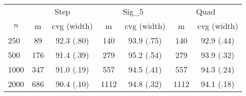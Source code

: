\begin{tabular}{lcccccc}
   \toprule
 
           & \multicolumn{2}{c}{Step}& \multicolumn{2}{c}{Sig\_5}& \multicolumn{2}{c}{Quad} \\ 
             \cmidrule(l{2pt}r{2pt}){2-3} \cmidrule(l{2pt}r{2pt}){4-5} \cmidrule(l{2pt}r{2pt}){6-7} 
             \multicolumn{1}{c}{$n$} & \multicolumn{1}{c}{m}& \multicolumn{1}{c}{cvg (width)}& \multicolumn{1}{c}{m}& \multicolumn{1}{c}{cvg (width)}& \multicolumn{1}{c}{m}& \multicolumn{1}{c}{cvg (width)} \\ \midrule 
        250 & 89 & 92.3 (.80) & 140 & 93.9 (.75) & 140 & 92.9 (.44) \\ 
  500 & 176 & 91.4 (.39) & 279 & 95.2 (.54) & 279 & 93.9 (.32) \\ 
  1000 & 347 & 91.0 (.19) & 557 & 94.5 (.41) & 557 & 94.3 (.24) \\ 
  2000 & 686 & 90.4 (.10) & 1112 & 94.8 (.32) & 1112 & 94.1 (.18) \\ 
   \hline
\end{tabular}
